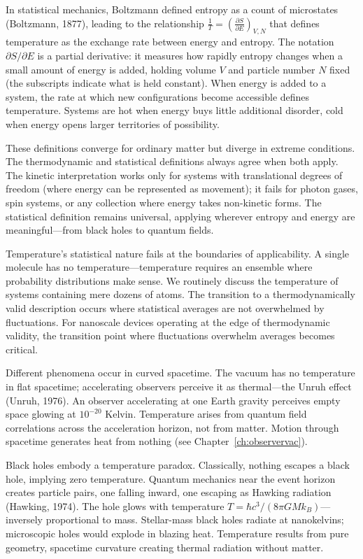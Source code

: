 In statistical mechanics, Boltzmann defined entropy as a count of microstates (Boltzmann, 1877), leading to the relationship $ \frac{1}{T} = \left( \frac{\partial S}{\partial E} \right)_{V,N} $ that defines temperature as the exchange rate between energy and entropy. The notation $\partial S/\partial E$ is a partial derivative: it measures how rapidly entropy changes when a small amount of energy is added, holding volume $V$ and particle number $N$ fixed (the subscripts indicate what is held constant). When energy is added to a system, the rate at which new configurations become accessible defines temperature. Systems are hot when energy buys little additional disorder, cold when energy opens larger territories of possibility.

These definitions converge for ordinary matter but diverge in extreme conditions. The thermodynamic and statistical definitions always agree when both apply. The kinetic interpretation works only for systems with translational degrees of freedom (where energy can be represented as movement); it fails for photon gases, spin systems, or any collection where energy takes non-kinetic forms. The statistical definition remains universal, applying wherever entropy and energy are meaningful—from black holes to quantum fields.

Temperature's statistical nature fails at the boundaries of applicability. A single molecule has no temperature—temperature requires an ensemble where probability distributions make sense. We routinely discuss the temperature of systems containing mere dozens of atoms. The transition to a thermodynamically valid description occurs where statistical averages are not overwhelmed by fluctuations. For nanoscale devices operating at the edge of thermodynamic validity, the transition point where fluctuations overwhelm averages becomes critical.

Different phenomena occur in curved spacetime. The vacuum has no temperature in flat spacetime; accelerating observers perceive it as thermal—the Unruh effect (Unruh, 1976). An observer accelerating at one Earth gravity perceives empty space glowing at $10^{-20}$ Kelvin. Temperature arises from quantum field correlations across the acceleration horizon, not from matter. Motion through spacetime generates heat from nothing (see Chapter~\textcolor{black}{\ref{ch:observervac}}).

Black holes embody a temperature paradox. Classically, nothing escapes a black hole, implying zero temperature. Quantum mechanics near the event horizon creates particle pairs, one falling inward, one escaping as Hawking radiation (Hawking, 1974). The hole glows with temperature $T = \hbar c^3 / (8\pi G M k_B)$—inversely proportional to mass. Stellar-mass black holes radiate at nanokelvins; microscopic holes would explode in blazing heat. Temperature results from pure geometry, spacetime curvature creating thermal radiation without matter.

